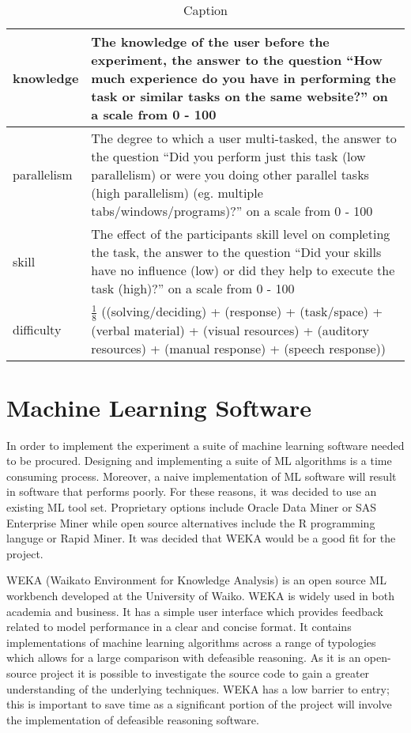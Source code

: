 \begin{table}[]
\begin{tabular}{|l|p{8cm}|}
 knowledge & The knowledge of the user before the experiment, the answer to the question ``How much experience do you have in performing the task or similar tasks on the same website?'' on a scale from 0 - 100 \\ \hline
 parallelism & The degree to which a user multi-tasked, the answer to the question ``Did you perform just this task (low parallelism) or were you doing other parallel tasks (high parallelism) (eg. multiple tabs/windows/programs)?'' on a scale from 0 - 100 \\ \hline
 skill & The effect of the participants skill level on completing the task, the answer to the question ``Did your skills have no influence (low) or did they help to execute the task (high)?'' on a scale from 0 - 100 \\ \hline
 difficulty & \( \frac{1}{8} \) ((solving/deciding) + (response) + (task/space) + (verbal material) + (visual resources) + (auditory resources) + (manual response) + (speech response)) \\ \hline
\end{tabular}
\caption{Caption}
\label{tab:my_label}
\end{table} 

\section{Machine Learning Software}

In order to implement the experiment a suite of machine learning software needed to be procured. Designing and implementing a suite of ML algorithms is a time consuming process. Moreover, a naive implementation of ML software will result in software that performs poorly. For these reasons, it was decided to use an existing ML tool set. Proprietary options include Oracle Data Miner or SAS Enterprise Miner while open source alternatives include the R programming languge or Rapid Miner. It was decided that WEKA would be a good fit for the project. 

WEKA (Waikato Environment for Knowledge Analysis) is an open source ML workbench developed at the University of Waiko. WEKA is widely used in both academia and business. It has a simple user interface which provides feedback related to model performance in a clear and concise format. It contains implementations of machine learning algorithms across a range of typologies which allows for a large comparison with defeasible reasoning. As it is an open-source project it is possible to investigate the source code to gain a greater understanding of the underlying techniques. WEKA has a low barrier to entry; this is important to save time as a significant portion of the project will involve the implementation of defeasible reasoning software.

